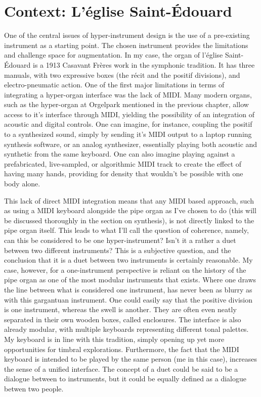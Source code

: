 \documentclass[12pt,twoside,maitrise]{dms_ks}
\theoremstyle{definition}
\begin{document}
{\section{Context: L'église Saint-Édouard}

One of the central issues of hyper-instrument design is the use of a pre-existing instrument as a starting point. 
The chosen instrument provides the limitations and challenge space for augmentation. 
In my case, the organ of l'église Saint-Édouard is a 1913 Casavant Frères work in the symphonic tradition. 
It has three manuals, with two expressive boxes (the récit and the positif divisions), and electro-pneumatic action. 
One of the first major limitations in terms of integrating a hyper-organ interface was the lack of MIDI. 
Many modern organs, such as the hyper-organ at Orgelpark mentioned in the previous chapter, allow access to it's interface through MIDI, yielding the possibility of an integration of acoustic and digital controls. 
One can imagine, for instance, coupling the positif to a synthesized sound, simply by sending it's MIDI output to a laptop running synthesis software, or an analog synthesizer, essentially playing both acoustic and synthetic from the same keyboard. 
One can also imagine playing against a prefabricated, live-sampled, or algorithmic MIDI track to create the effect of having many hands, providing for density that wouldn't be possible with one body alone.

This lack of direct MIDI integration means that any MIDI based approach, such as using a MIDI keyboard alongside the pipe organ as I've chosen to do (this will be discussed thoroughly in the section on synthesis), is not directly linked to the pipe organ itself.
This leads to what I'll call the question of coherence, namely, can this be considered to be one hyper-instrument?
Isn't it a rather a duet between two different instruments?
This is a subjective question, and the conclusion that it is a duet between two instruments is certainly reasonable.
My case, however, for a one-instrument perspective is reliant on the history of the pipe organ as one of the most modular instruments that exists.
Where one draws the line between what is considered one instrument, has never been as blurry as with this gargantuan instrument.
One could easily say that the positive division is one instrument, whereas the swell is another.
They are often even neatly separated in their own wooden boxes, called enclosures.
The interface is also already modular, with multiple keyboards representing different tonal palettes.
My keyboard is in line with this tradition, simply opening up yet more opportunities for timbral explorations.
Furthermore, the fact that the MIDI keyboard is intended to be played by the same person (me in this case), increases the sense of a unified interface.
The concept of a duet could be said to be a dialogue between to instruments, but it could be equally defined as a dialogue betwen two people.

}
\end{document}
